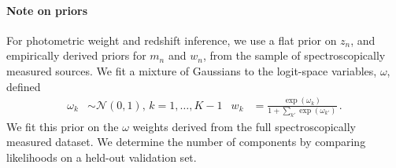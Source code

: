 \documentclass{article} %
\begin{document}
\paragraph{Note on priors}
For photometric weight and redshift inference, we use a flat prior on $z_n$, and empirically derived priors for $m_n$ and $w_n$, from the sample of spectroscopically measured sources.  
We fit a mixture of Gaussians to the logit-space variables, $\omega$, defined 
\begin{align}
  \omega_k &\sim \mathcal{N}(0, 1), \, k = 1, \dots, K-1 &
  w_k &= \frac{\exp(\omega_k)}{1 + \sum_{k'} \exp(\omega_{k'})} \, .
\end{align}
We fit this prior on the $\omega$ weights derived from the full spectroscopically measured dataset.  We determine the number of components by comparing likelihoods on a held-out validation set.  


%
\end{document}
